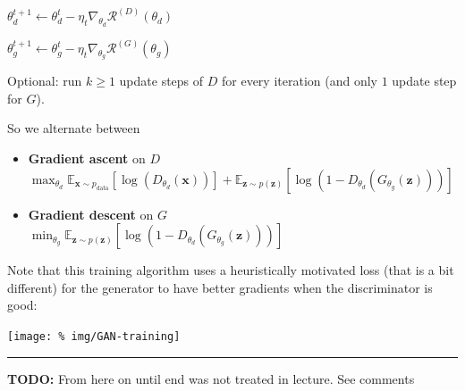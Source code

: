 \documentclass[a2paper,8pt]{extarticle}
\newcommand{\cN}{\mathcal{N}}
\newcommand{\cR}{\mathcal{R}}
\newcommand{\Exp}[2][]{{\mathbb{E}_{#1}}\left[ #2
\right]}
\newcommand{\mat}[1]{\mathbf{#1}}
\renewcommand{\vec}[1]{\mathbf{#1}}
\newcommand{\vx}{\vec{x}}
\newcommand{\vz}{\vec{z}}
\newcommand{\vmu}{\boldsymbol{\mu}}
\newcommand{\MSigma}{\mat{\Sigma}}
\newcommand{\todo}[1]{\textbf{TODO:} #1}
\newcommand{\todo}[1]{%
}
\newcommand{\sep}{\vspace{0pt}\noindent\hrule\vspace{0pt}}
\newcommand{\ssep}{\hdashrule[1.1ex]{\linewidth}{0.1pt}{0.3mm}\vspace{-6pt}}
\newcommand{\sep}{\vspace{5pt}\noindent\hrule\vspace{5pt}}
\newcommand{\ssep}{\hdashrule[1.1ex]{\linewidth}{0.1pt}{0.3mm}\vspace{-3pt}}
\begin{document}
\begin{landscape}
\begin{multicols*}{7}
$\theta_d^{t+1}\gets\theta_d^t-\eta_t\nabla_{\theta_d}\cR^{(D)}(\theta_d)$

$\theta_g^{t+1}\gets\theta_g^t-\eta_t\nabla_{\theta_g}\cR^{(G)}(\theta_g)$

Optional: run $k\geq 1$ update steps of $D$ for every iteration (and only
$1$ update step for $G$).

So we alternate between
\begin{itemize}
  \item \textbf{Gradient ascent} on $D$\\
  $
\max_{\theta_d}
\Exp[\vx\sim p_{\text{data}}]{\log(D_{\theta_d}(\vx))}
+
\Exp[\vz\sim p(\vz)]{\log(1-D_{\theta_d}(G_{\theta_g}(\vz)))}
  $
  \item \textbf{Gradient descent} on $G$\\
  $
\min_{\theta_g}
\Exp[\vz\sim p(\vz)]{\log(1-D_{\theta_d}(G_{\theta_g}(\vz)))}
  $
\end{itemize}

\ssep

Note that this training algorithm uses a heuristically motivated loss (that is
a bit different) for the generator to have better gradients when the
discriminator is good:

\begin{center}
  \texttt{[image: \%
img/GAN-training]}
\end{center}

\sep

\todo{From here on until end was not treated in lecture. See comments}

\end{multicols*}
\end{landscape}
\end{document}
